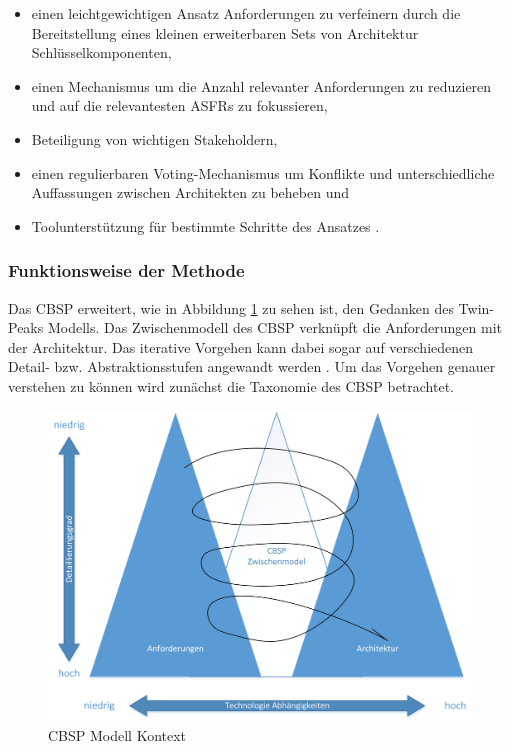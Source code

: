 \begin{itemize}
\item einen leichtgewichtigen Ansatz Anforderungen zu verfeinern durch die Bereitstellung eines kleinen erweiterbaren Sets von Architektur Schlüsselkomponenten, 
\item einen Mechanismus um die Anzahl relevanter Anforderungen zu reduzieren und auf die relevantesten ASFRs zu fokussieren, 
\item Beteiligung von wichtigen Stakeholdern, 
\item einen regulierbaren Voting-Mechanismus um Konflikte und unterschiedliche Auffassungen zwischen Architekten zu beheben und
\item Toolunterstützung für bestimmte Schritte des Ansatzes \cite{Gru01}. \\
\end{itemize}

\subsubsection{Funktionsweise der Methode}

Das CBSP erweitert, wie in Abbildung \ref{fig_cbsp_model} zu sehen ist, den Gedanken des Twin-Peaks Modells. Das Zwischenmodell des CBSP verknüpft die Anforderungen mit der Architektur. Das iterative Vorgehen kann dabei sogar auf verschiedenen Detail- bzw. Abstraktionsstufen angewandt werden \cite{Gru01}. 
Um das Vorgehen genauer verstehen zu können wird zunächst die Taxonomie des CBSP betrachtet. \\

\begin{figure}[h]
	\centering
	\includegraphics[scale=0.5]{cbsp_model2.png} 
	\caption{CBSP Modell Kontext \cite{Gru01}}
	\label{fig_cbsp_model}
\end{figure}

